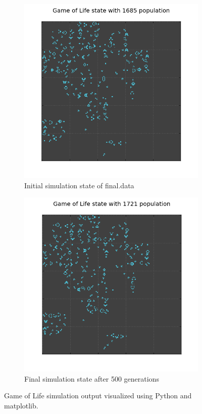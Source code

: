 \documentclass[11pt,letterpaper]{article}
\begin{document}
\begin{figure}[h]
	\centering
	\begin{subfigure}{0.49\textwidth}
		\centering
		\includegraphics[width=\textwidth]{figures/initial_state.png}
		\caption{\textsf{Initial simulation state of final.data}}
        \label{fig:initial_state}
	\end{subfigure} \hfill
	\begin{subfigure}{0.49\textwidth}
		\centering
		\includegraphics[width=\textwidth]{figures/final_state.png}
		\caption{\textsf{Final simulation state after 500 generations}}
        \label{fig:final_state}
	\end{subfigure}
    \caption{\textsf{Game of Life simulation output visualized using Python and matplotlib.}}
    \label{fig:centrality}
\end{figure}
\end{document}
